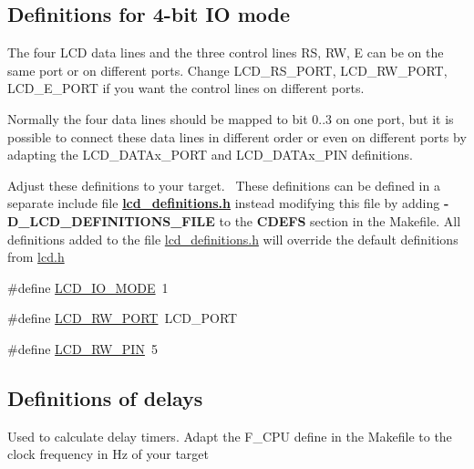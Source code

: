\subsection*{Definitions for 4-\/bit IO mode}
\label{_amgrp0d38ed8c5b4202f593f69f9003c1a16c}%
The four L\+CD data lines and the three control lines RS, RW, E can be on the same port or on different ports. Change L\+C\+D\+\_\+\+R\+S\+\_\+\+P\+O\+RT, L\+C\+D\+\_\+\+R\+W\+\_\+\+P\+O\+RT, L\+C\+D\+\_\+\+E\+\_\+\+P\+O\+RT if you want the control lines on different ports.

Normally the four data lines should be mapped to bit 0..3 on one port, but it is possible to connect these data lines in different order or even on different ports by adapting the L\+C\+D\+\_\+\+D\+A\+T\+Ax\+\_\+\+P\+O\+RT and L\+C\+D\+\_\+\+D\+A\+T\+Ax\+\_\+\+P\+IN definitions.

Adjust these definitions to your target.~\newline
These definitions can be defined in a separate include file {\bfseries \hyperlink{lcd__definitions_8h_source}{lcd\+\_\+definitions.\+h}} instead modifying this file by adding {\bfseries -\/\+D\+\_\+\+L\+C\+D\+\_\+\+D\+E\+F\+I\+N\+I\+T\+I\+O\+N\+S\+\_\+\+F\+I\+LE} to the {\bfseries C\+D\+E\+FS} section in the Makefile. All definitions added to the file \hyperlink{lcd__definitions_8h_source}{lcd\+\_\+definitions.\+h} will override the default definitions from \hyperlink{lcd_8h}{lcd.\+h} \begin{DoxyCompactItemize}
\item 
\#define \hyperlink{group__pfleury__lcd_ga659fcdf979f69bbd14f852f525f25e02}{L\+C\+D\+\_\+\+I\+O\+\_\+\+M\+O\+DE}~1
\item 
\#define \hyperlink{group__pfleury__lcd_gae8772bdf31db863b81805c837bdc2da2}{L\+C\+D\+\_\+\+R\+W\+\_\+\+P\+O\+RT}~L\+C\+D\+\_\+\+P\+O\+RT
\item 
\#define \hyperlink{group__pfleury__lcd_ga3ac938dd5fc02a9a232df6605b5f6aa8}{L\+C\+D\+\_\+\+R\+W\+\_\+\+P\+IN}~5
\end{DoxyCompactItemize}
\subsection*{Definitions of delays}
\label{_amgrp73324fc181df7d63636f86a5b76e74f2}%
Used to calculate delay timers. Adapt the F\+\_\+\+C\+PU define in the Makefile to the clock frequency in Hz of your target


